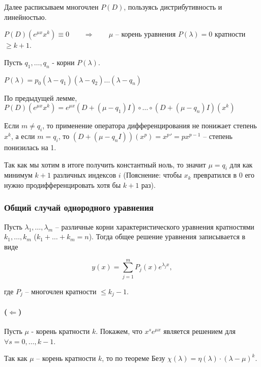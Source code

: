 Далее расписываем многочлен $P(D)$, пользуясь дистрибутивность и линейностью.

\Endproof

\Lemma $P(D)(e^{\mu x} x^k) \equiv 0 \qquad \Rightarrow \qquad \mu$ -- корень уравнения $P(\lambda) = 0$ кратности $\geq k+1$.

\Proof

Пусть $q_1, \dots, q_n$ - корни $P(\lambda)$.

$P(\lambda) = p_0 (\lambda - q_1) (\lambda - q_2) \dots (\lambda - q_n)$

По предыдущей лемме, $P(D)(e^{\mu x} x^k) = e^{\mu x} (D + (\mu - q_1) I) \circ \dots \circ (D + (\mu - q_n) I) (x^k)$

Если $m \neq q_i$, то применение оператора дифференцирования не понижает степень $x^k$, а если $m = q_i$, то $(D + (\mu - q_n I)) (x^p) = x^p' = px^{p-1}$ -- степень понизилась на 1.

Так как мы хотим в итоге получить константный ноль, то значит $\mu = q_i$ для как минимум $k+1$ различных индексов $i$ (Пояснение: чтобы $x_k$ превратился в 0 его нужно продифференцировать хотя бы $k+1$ раз).

\Endproof

\subsubsection{Общий случай однородного уравнения}

\Th Пусть $\lambda_1, \dots, \lambda_m$ -- различные корни характеристического уравнения кратностями $k_1, \dots, k_m$ ($k_1 + \dots + k_m = n$).
Тогда общее решение уравнения записывается в виде

\begin{equation}
    y(x) = \sum_{j=1}^m P_j(x) e^{\lambda_j x},
    \label{eq:lin_diff_eq_const_coef_full_sol}
\end{equation}

где $P_j$ -- многочлен кратности $\leq k_j - 1$.

\Proof

\paragraph{($\Leftarrow$)} Пусть $\mu$ - корень кратности $k$. Покажем, что $x^s e^{\mu x}$ является решением для $\forall s=0, \dots, k-1$.

Так как $\mu$ -- корень кратности $k$, то по теореме Безу $\chi(\lambda) = \eta(\lambda) \cdot (\lambda - \mu)^k$.

